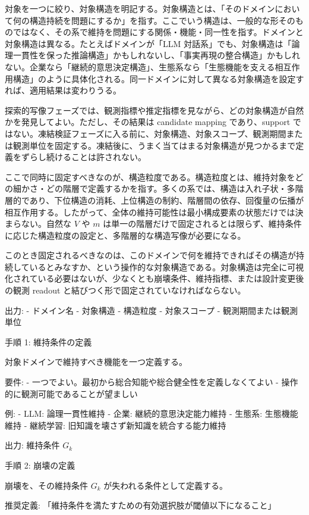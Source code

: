 \documentclass[12pt,a4paper]{article}
\begin{document}
対象を一つに絞り、対象構造を明記する。対象構造とは、「そのドメインにおいて何の構造持続を問題にするか」を指す。ここでいう構造は、一般的な形そのものではなく、その系で維持を問題にする関係・機能・同一性を指す。ドメインと対象構造は異なる。たとえばドメインが「LLM 対話系」でも、対象構造は「論理一貫性を保った推論構造」かもしれないし、「事実再現の整合構造」かもしれない。企業なら「継続的意思決定構造」、生態系なら「生態機能を支える相互作用構造」のように具体化される。同一ドメインに対して異なる対象構造を設定すれば、適用結果は変わりうる。

探索的写像フェーズでは、観測指標や推定指標を見ながら、どの対象構造が自然かを発見してよい。ただし、その結果は candidate mapping であり、support ではない。凍結検証フェーズに入る前に、対象構造、対象スコープ、観測期間または観測単位を固定する。凍結後に、うまく当てはまる対象構造が見つかるまで定義をずらし続けることは許されない。

ここで同時に固定すべきなのが、構造粒度である。構造粒度とは、維持対象をどの細かさ・どの階層で定義するかを指す。多くの系では、構造は入れ子状・多階層的であり、下位構造の消耗、上位構造の制約、階層間の依存、回復量の伝播が相互作用する。したがって、全体の維持可能性は最小構成要素の状態だけでは決まらない。自然な \(V\) や \(m\) は単一の階層だけで固定されるとは限らず、維持条件に応じた構造粒度の設定と、多階層的な構造写像が必要になる。

このとき固定されるべきなのは、このドメインで何を維持できればその構造が持続しているとみなすか、という操作的な対象構造である。対象構造は完全に可視化されている必要はないが、少なくとも崩壊条件、維持指標、または設計変更後の観測 readout と結びつく形で固定されていなければならない。

出力: - ドメイン名 - 対象構造 - 構造粒度 - 対象スコープ - 観測期間または観測単位

手順 1: 維持条件の定義

対象ドメインで維持すべき機能を一つ定義する。

要件: - 一つでよい。最初から総合知能や総合健全性を定義しなくてよい - 操作的に観測可能であることが望ましい

例: - LLM: 論理一貫性維持 - 企業: 継続的意思決定能力維持 - 生態系: 生態機能維持 - 継続学習: 旧知識を壊さず新知識を統合する能力維持

出力: 維持条件 \(G_{k}\)

手順 2: 崩壊の定義

崩壊を、その維持条件 \(G_{k}\) が失われる条件として定義する。

推奨定義: 「維持条件を満たすための有効選択肢が閾値以下になること」
\end{document}
